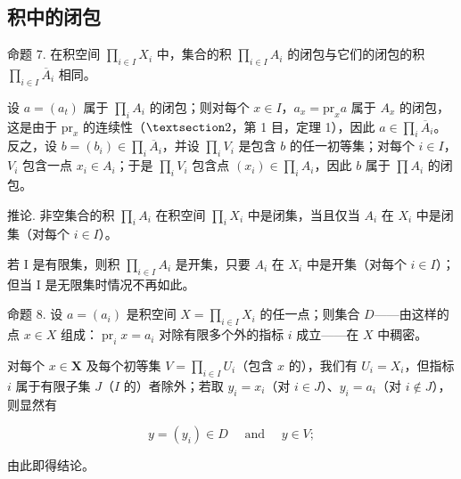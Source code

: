 \subsection{积中的闭包}

命题 7. 在积空间 \(\prod_{i\in I}X_i\) 中，集合的积 \(\prod_{i\in I}A_i\) 的闭包与它们的闭包的积 \(\prod_{i\in I}\overline{A}_i\) 相同。

设 \(a = (a_{t})\) 属于 \(\prod_{i} A_{i}\) 的闭包；则对每个 \(x \in I\)，\(a_{x} = \text{pr}_{x} a\) 属于 \(A_{x}\) 的闭包，这是由于 \(\text{pr}_{x}\) 的连续性（\(\S 2\)，第 1 目，定理 1），因此 \(a \in \prod_{i} \overline{A}_{i}\)。反之，设 \(b = (b_{i}) \in \prod_{i} \overline{A}_{i}\)，并设 \(\prod_{i} V_{i}\) 是包含 \(b\) 的任一初等集；对每个 \(i \in I\)，\(V_{i}\) 包含一点 \(x_{i} \in A_{i}\)；于是 \(\prod_{i} V_{i}\) 包含点 \((x_{i}) \in \prod_{i} A_{i}\)，因此 \(b\) 属于 \(\prod A_{i}\) 的闭包。

推论. 非空集合的积 \(\prod_{i} A_{i}\) 在积空间 \(\prod_{i} X_{i}\) 中是闭集，当且仅当 \(A_{i}\) 在 \(X_{i}\) 中是闭集（对每个 \(i \in I\)）。

若 I 是有限集，则积 \(\prod_{i\in I}A_i\) 是开集，只要 \(A_i\) 在 \(X_i\) 中是开集（对每个 \(i\in I\)）；但当 I 是无限集时情况不再如此。

命题 8. 设 \(a = (a_{i})\) 是积空间 \(X = \prod_{i \in I} X_{i}\) 的任一点；则集合 \(D\)——由这样的点 \(x \in X\) 组成：\(\operatorname{pr}_{i} x = a_{i}\) 对除有限多个外的指标 \(i\) 成立——在 \(X\) 中稠密。

对每个 \(x \in \mathbf{X}\) 及每个初等集 \(V = \prod_{i \in I} U_i\)（包含 \(x\) 的），我们有 \(U_i = X_i\)，但指标 \(i\) 属于有限子集 \(J\)（\(I\) 的）者除外；若取 \(y_i = x_i\)（对 \(i \in J\)）、\(y_i = a_i\)（对 \(i \notin J\)），则显然有

\[
y = (y _ {i}) \in D \quad \text { and } \quad y \in V;
\]

由此即得结论。

